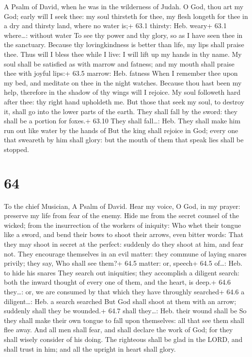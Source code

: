 A Psalm of David, when he was in the wilderness of Judah.  O
God, thou art my God; early will I seek thee: my soul thirsteth for
thee, my flesh longeth for thee in a dry and thirsty land, where no
water is;+ 63.1 thirsty: Heb. weary+ 63.1 where\ldots: without water
 To see thy power and thy glory, so as I have seen thee in
the sanctuary.  Because thy lovingkindness is better than
life, my lips shall praise thee.  Thus will I bless thee
while I live: I will lift up my hands in thy name.  My soul
shall be satisfied as with marrow and fatness; and my mouth shall praise
thee with joyful lips:+ 63.5 marrow: Heb. fatness  When I
remember thee upon my bed, and meditate on thee in the night watches.
 Because thou hast been my help, therefore in the shadow of
thy wings will I rejoice.  My soul followeth hard after
thee: thy right hand upholdeth me.  But those that seek my
soul, to destroy it, shall go into the lower parts of the earth.
 They shall fall by the sword: they shall be a portion for
foxes.+ 63.10 They shall fall\ldots: Heb. They shall make him run out
like water by the hands of  But the king shall rejoice in
God; every one that sweareth by him shall glory: but the mouth of them
that speak lies shall be stopped.

\hypertarget{section-63}{%
\section{64}\label{section-63}}

To the chief Musician, A Psalm of David.  Hear my voice, O
God, in my prayer: preserve my life from fear of the enemy. 
Hide me from the secret counsel of the wicked; from the insurrection of
the workers of iniquity:  Who whet their tongue like a
sword, and bend their bows to shoot their arrows, even bitter words:
 That they may shoot in secret at the perfect: suddenly do
they shoot at him, and fear not.  They encourage themselves
in an evil matter: they commune of laying snares privily; they say, Who
shall see them?+ 64.5 matter: or, speech+ 64.5 of\ldots: Heb. to hide
his snares  They search out iniquities; they accomplish a
diligent search: both the inward thought of every one of them, and the
heart, is deep.+ 64.6 they\ldots: or, we are consumed by that which they
have throughly searched+ 64.6 a diligent\ldots: Heb. a search searched
 But God shall shoot at them with an arrow; suddenly shall
they be wounded.+ 64.7 shall they\ldots: Heb. their wound shall be
 So they shall make their own tongue to fall upon
themselves: all that see them shall flee away.  And all men
shall fear, and shall declare the work of God; for they shall wisely
consider of his doing.  The righteous shall be glad in the
LORD, and shall trust in him; and all the upright in heart shall glory.

